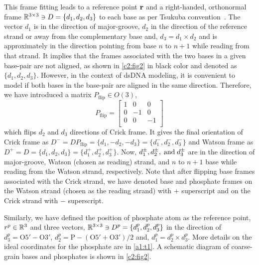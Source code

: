 This frame fitting leads to a reference point $\mathbf{r}$ and a right-handed, orthonormal frame ${\mathbb R}^{3 \times 3} \ni D = \{d_1,d_2,d_3\}$ to each base as per Tsukuba convention~\cite{tsukuba}. 
The vector $d_1$ is in the direction of major-groove, $d_2$ in the direction of the reference strand or away from the complementary base and, $d_3 = d_1 \times d_2$ and is approximately in the direction pointing from base $n$ to $n+1$ while reading from that strand.
It implies that the frames associated with the two bases in a given base-pair are not aligned, as shown in \cref{c2:fig2} in black color and denoted as $\{d_1,d_2,d_3\}$.
However, in the context of dsDNA modeling, it is convenient to model if both bases in the base-pair %
are aligned in the same direction.
Therefore, we have introduced a matrix $P_\text{{flip}} \in O(3)$,
\begin{equation}
P_\text{{flip}} = 
\begin{bmatrix}
1 & 0 & 0\\
0 &-1 & 0\\
0 & 0 & -1\\
\end{bmatrix}
\label{flipmat}
\end{equation}
which flips $d_2$ and $d_3$ directions of Crick frame. 
It gives the final orientation of Crick frame as $D^{-} = DP_\text{{flip}}=\{d_1,-d_2,-d_3\}=\{d_1^-,d_2^-,d_3^-\}$ and Watson frame as $D^{+} = D = \{d_1,d_2,d_3\}=\{d_1^+,d_2^+,d_3^+\}$.
Now, $d_1^{\pm},d_2^{\pm}, {\;\text{and\;}} d_3^{\pm}$ are in the direction of major-groove, Watson (chosen as reading) strand, and $n$ to $n+1$ base while reading from the Watson strand, respectively.  
Note that after flipping base frames associated with the Crick strand, we have denoted base and phosphate frames on the Watson strand (chosen as the reading strand) with $+$ superscript and on the Crick strand with $-$ superscript.

Similarly, we have defined the 
position of phosphate atom as the reference point, $r^{p} \in {\mathbb R}^3$ and 
three vectors, ${\mathbb R}^{3 \times 3} \ni D^{p} = \{d_{1}^{p},d_{2}^{p},d_{3}^{p}\}$ in the direction of $d_{3}^{p}= \text{O5}' - \text{O3}'$, 
$d_{2}^{p}= \text{P} - (\text{O5}' + \text{O3}')/2$ and, $d_{1}^{p}=d_{2}^{p} \times d_{3}^{p}$.
More details on the ideal coordinates for the phosphate are in \cref{a1:t1}. 
A schematic diagram of coarse-grain bases and phosphates is shown in \cref{c2:fig2}. 
